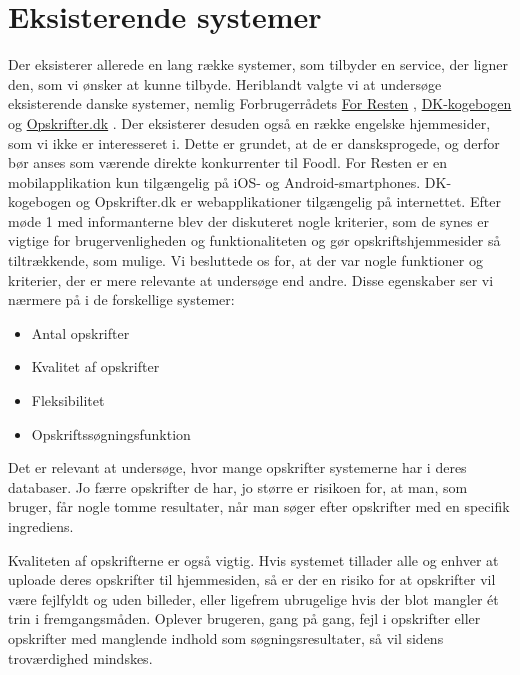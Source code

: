 \section{Eksisterende systemer}
\label{sec:eksisterendesystemer}

Der eksisterer allerede en lang række systemer, som tilbyder en service, der ligner den, som vi ønsker at kunne tilbyde. Heriblandt valgte vi at undersøge  eksisterende danske systemer, nemlig Forbrugerrådets \href{https://play.google.com/store/apps/details?id=com.nodes.forresten}{For Resten} \cite{forresten}, \href{http://www.dk-kogebogen.dk/}{DK-kogebogen} \cite{dkkogebogen} og \href{http://opskrifter.dk/}{Opskrifter.dk} \cite{opskrifterdk}. Der eksisterer desuden også en række engelske hjemmesider, som vi ikke er interesseret i. Dette er grundet, at de er dansksprogede, og derfor bør anses som værende direkte konkurrenter til Foodl. For Resten er en mobilapplikation kun tilgængelig på iOS- og Android-smartphones. DK-kogebogen og Opskrifter.dk er webapplikationer tilgængelig på internettet. Efter møde 1 med informanterne blev der diskuteret nogle kriterier, som de synes er vigtige for brugervenligheden og funktionaliteten og gør opskriftshjemmesider så tiltrækkende, som mulige. Vi besluttede os for, at der var nogle funktioner og kriterier,  der er mere relevante at undersøge end andre. Disse egenskaber ser vi nærmere på i de forskellige systemer:

\begin{itemize}[noitemsep]
  \item Antal opskrifter
  \item Kvalitet af opskrifter
  \item Fleksibilitet
  \item Opskriftssøgningsfunktion
\end{itemize}

Det er relevant at undersøge, hvor mange opskrifter systemerne har i deres databaser. Jo færre opskrifter de har, jo større er risikoen for, at man, som bruger, får nogle tomme resultater, når man søger efter opskrifter med en specifik ingrediens. 

Kvaliteten af opskrifterne er også vigtig. Hvis systemet tillader alle og enhver at uploade deres opskrifter til hjemmesiden, så er der en risiko for at opskrifter vil være fejlfyldt og uden billeder, eller ligefrem ubrugelige hvis der blot mangler \'{e}t trin i fremgangsmåden. Oplever brugeren, gang på gang, fejl i opskrifter eller opskrifter med manglende indhold som søgningsresultater, så vil sidens troværdighed mindskes. 

